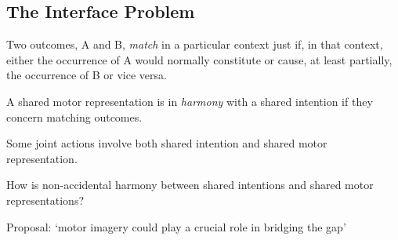\documentclass[11pt]{extarticle}
\begin{document}
\begin{multicols}{3}





\section{The Interface Problem}
Two  outcomes, A and B, \emph{match} in a particular context just if, in that context, either the occurrence of A would normally constitute or cause, at least partially, the occurrence of B or vice versa. 

A shared motor representation is in \emph{harmony} with a shared intention if they concern matching outcomes.

Some joint actions involve both shared intention and shared motor representation.

How is non-accidental harmony between shared intentions and shared motor representations?

Proposal: `motor imagery could play a crucial role in bridging the gap'\citep{pacherie:2000_content}




\footnotesize 


\end{multicols}
\end{document}
